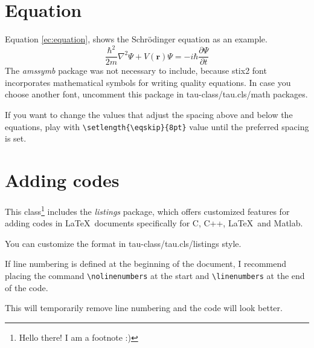\documentclass[10pt,a4paper,twocolumn,twoside]{tau-class/tau}
\begin{document}
\section{Equation}

    Equation \ref{ec:equation}, shows the Schrödinger equation as an example. 
	\begin{equation} \label{ec:equation}
		\frac{\hbar^2}{2m}\nabla^2\Psi + V(\mathbf{r})\Psi = -i\hbar \frac{\partial\Psi}{\partial t}
	\end{equation} 
    The \textit{amssymb} package was not necessary to include, because stix2 font incorporates mathematical symbols for writing quality equations. In case you choose another font, uncomment this package in tau-class/tau.cls/math packages.
	
    If you want to change the values that adjust the spacing above and below the equations, play with \verb|\setlength{\eqskip}{8pt}| value until the preferred spacing is set.
	
\section{Adding codes}
	
    This class\footnote{Hello there! I am a footnote :)} includes the \textit{listings} package, which offers customized features for adding codes in \LaTeX\ documents specifically for C, C++, \LaTeX\ and Matlab. 
	
    You can customize the format in tau-class/tau.cls/listings style.
	
    
	
    If line numbering is defined at the beginning of the document, I recommend placing the command \verb|\nolinenumbers| at the start and \verb|\linenumbers| at the end of the code. 
    
    This will temporarily remove line numbering and the code will look better.
	


\printbibliography

\end{document}
